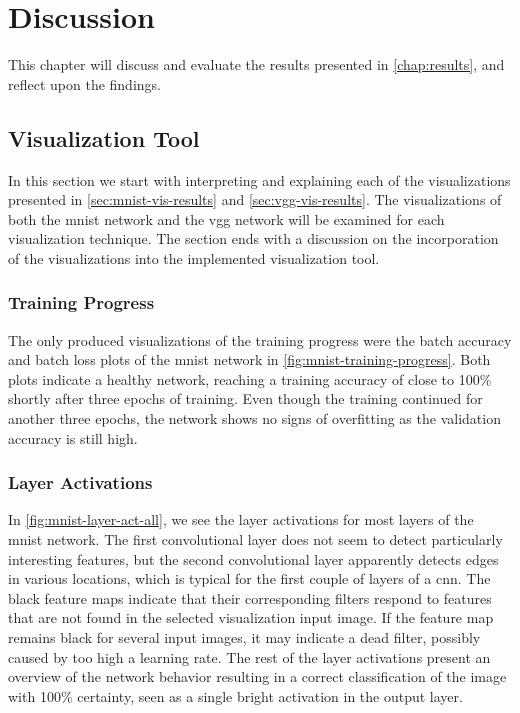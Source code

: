 
\chapter{Discussion} \label{chap:discussion}

This chapter will discuss and evaluate the results presented in \autoref{chap:results}, and reflect upon the findings.

\section{Visualization Tool}

In this section we start with interpreting and explaining each of the visualizations presented in \autoref{sec:mnist-vis-results} and \autoref{sec:vgg-vis-results}. The visualizations of both the \acrshort{mnist} network and the \acrshort{vgg} network will be examined for each visualization technique. The section ends with a discussion on the incorporation of the visualizations into the implemented visualization tool.


\subsection{Training Progress}

The only produced visualizations of the training progress were the batch accuracy and batch loss plots of the \acrshort{mnist} network in \autoref{fig:mnist-training-progress}. Both plots indicate a healthy network, reaching a training accuracy of close to 100\% shortly after three epochs of training. Even though the training continued for another three epochs, the network shows no signs of overfitting as the validation accuracy is still high.

\subsection{Layer Activations}

In \autoref{fig:mnist-layer-act-all}, we see the layer activations for most layers of the \acrshort{mnist} network. The first convolutional layer does not seem to detect particularly interesting features, but the second convolutional layer apparently detects edges in various locations, which is typical for the first couple of layers of a \acrshort{cnn}. The black feature maps indicate that their corresponding filters respond to features that are not found in the selected visualization input image. If the feature map remains black for several input images, it may indicate a dead filter, possibly caused by too high a learning rate. The rest of the layer activations present an overview of the network behavior resulting in a correct classification of the image with 100\% certainty, seen as a single bright activation in the output layer. \\


